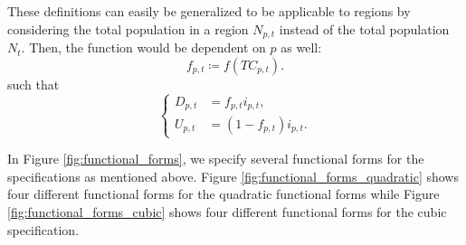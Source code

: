 \documentclass[12pt]{article}
\begin{document}
	These definitions can easily be generalized to be applicable to regions by considering the total population in a region $N_{p,t}$ instead of the total population $N_t$. Then, the function would be dependent on $p$ as well: 
	\begin{equation} \label{eq:f_rt}
	f_{p,t} \coloneqq f(TC_{p,t}).
	\end{equation}
	such that
	\begin{equation*}
	    \begin{cases}
	        D_{p,t} &= f_{p,t}i_{p,t}, \\
	        U_{p,t} &= (1-f_{p,t})i_{p,t}.
	    \end{cases}
	\end{equation*}
	
	In Figure \ref{fig:functional_forms}, we specify several functional forms for the specifications as mentioned above. Figure \ref{fig:functional_forms_quadratic} shows four different functional forms for the quadratic functional forms while Figure \ref{fig:functional_forms_cubic} shows four different functional forms for the cubic specification.
	
	\def\N{100}
	\def\fmin{0.1}
	
\end{document}
